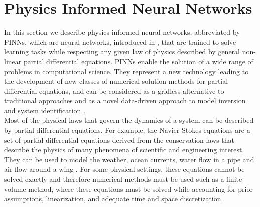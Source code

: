 \section{Physics Informed Neural Networks}
\label{ch1:sec4}

In this section we describe physics informed neural networks, abbreviated by PINNs, which are neural networks, introduced in \cite{RaissiPerdikarisKarniadakisPart1:2017}, that are trained to solve learning tasks while respecting any given law of physics described by general non-linear partial differential equations. PINNs enable the solution of a wide range of problems in computational science. They represent a new technology leading to the development of new classes of numerical solution methods for partial differential equations, and can be considered as a gridless alternative to traditional approaches and as a novel data-driven approach to model inversion and system identification \cite[p.~3]{RaissiPerdikarisKarniadakis:2019}. \\
Most of the physical laws that govern the dynamics of a system can be described by partial differential equations. For example, the Navier-Stokes equations are a set of partial differential equations derived from the conservation laws that describe the physics of many phenomena of scientific and engineering interest. They can be used to model the weather, ocean currents, water flow in a pipe and air flow around a wing \cite[p.~15]{RaissiPerdikarisKarniadakis:2019}. For some physical settings, these equations cannot be solved exactly and therefore numerical methods must be used such as a finite volume method, where these equations must be solved while accounting for prior assumptions, linearization, and adequate time and space discretization. \\
